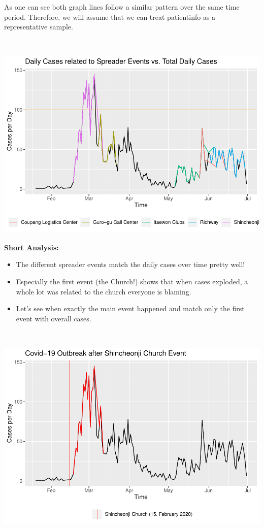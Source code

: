 \documentclass[
]{article}
\providecommand{\tightlist}{%
  \setlength{\itemsep}{0pt}\setlength{\parskip}{0pt}}
\begin{document}
As one can see both graph lines follow a similar pattern over the same
time period. Therefore, we will assume that we can treat patientinfo as
a representative sample.

~

\includegraphics{Main_Analysis_files/figure-latex/unnamed-chunk-17-1.pdf}

\textbf{Short Analysis:}

\begin{itemize}
\tightlist
\item
  The different spreader events match the daily cases over time pretty
  well!
\item
  Especially the first event (the Church!) shows that when cases
  exploded, a whole lot was related to the church everyone is blaming.
\item
  Let's see when exactly the main event happened and match only the
  first event with overall cases.
\end{itemize}

~

\includegraphics{Main_Analysis_files/figure-latex/unnamed-chunk-18-1.pdf}
\end{document}
